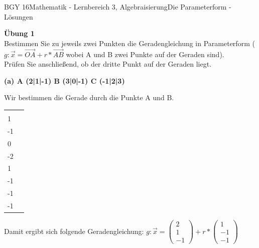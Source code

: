 \documentclass[oneside,openany,headings=optiontotoc,11pt,numbers=noenddot]{scrreprt}
\begin{document}
	\begin{worksheet}{BGY 16}{Mathematik - Lernbereich 3, Algebraisierung}{Die Parameterform - Lösungen}
				
		\begin{framed}
			\noindent
			\tiny{\color{codegray}\textbf{Übung 1}\\Bestimmen Sie zu jeweils zwei Punkten die Geradengleichung in Parameterform (\(g: \vec{x} = \overrightarrow{OA} + r*\overrightarrow{AB}\) wobei A und B zwei Punkte auf der Geraden sind).\\
			Prüfen Sie anschließend, ob der dritte Punkt auf der Geraden liegt.}
			\par\bigskip
			\textbf{(a) A (2|1|-1) B (3|0|-1) C (-1|2|3)}\\
			\par\noindent
			Wir bestimmen die Gerade durch die Punkte A und B.\\
			\par\noindent
			\begin{tabularx}{\textwidth}{XX}
				\(\overrightarrow{OA} = \vec{A} -\vec{O} = \left(\begin{array}{c}2 \\ 1 \\ -1\end{array}\right)\) & \(\overrightarrow{AB} = \vec{B} -\vec{A} = \left(\begin{array}{c}3 \\ 0 \\ -2\end{array}\right) - \left(\begin{array}{c}2 \\ 1 \\ -1\end{array}\right) = \left(\begin{array}{c}1 \\ -1 \\ -1\end{array}\right)\)
			\end{tabularx}
			Damit ergibt sich folgende Geradengleichung: \(g: \vec{x} = \left(\begin{array}{c}2 \\ 1 \\ -1\end{array}\right) + r*\left(\begin{array}{c}1\\-1\\-1\end{array}\right)\)\\

\end{framed}
\end{worksheet}
\end{document}
